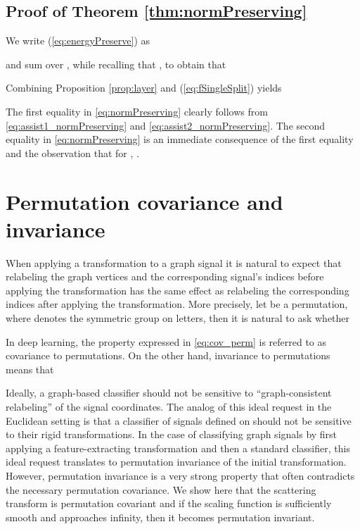 \documentclass{article}
\begin{document}
 



\subsection{Proof of Theorem \ref{thm:normPreserving}}
We write (\ref{eq:energyPreserve}) as

and sum over , while recalling that , to obtain that

Combining Proposition \ref{prop:layer} and (\ref{eq:fSingleSplit}) yields 

The first equality in \eqref{eq:normPreserving} clearly follows from \eqref{eq:assist1_normPreserving}
and \eqref{eq:assist2_normPreserving}. The second equality in \eqref{eq:normPreserving} is an immediate consequence of the first equality and the observation that for , .


\section{Permutation covariance and invariance}\label{sec:shift}

When applying a transformation  to a graph signal it is natural to expect that relabeling the graph vertices and the corresponding signal's indices before applying the transformation has the same effect as relabeling the corresponding indices after applying the transformation. More precisely, let  be a permutation, where  denotes the symmetric group on  letters, then it is natural to ask whether  

In deep learning, the property expressed in \eqref{eq:cov_perm} is referred to as covariance to permutations. On the other hand, invariance to permutations means that  


Ideally, a graph-based classifier should not be sensitive to ``graph-consistent relabeling'' of the signal coordinates. The analog of this ideal request in the Euclidean setting is that a classifier of signals defined on  should not be sensitive to their {rigid transformations}. In the case of classifying graph signals by first applying a feature-extracting transformation and then a standard classifier,  this ideal request translates to permutation invariance of the initial transformation. However, permutation invariance is a very strong property that often contradicts the necessary permutation covariance. We show here that the scattering transform is permutation covariant and if the scaling function is sufficiently smooth and  approaches infinity, then it becomes permutation invariant. 
\end{document}
